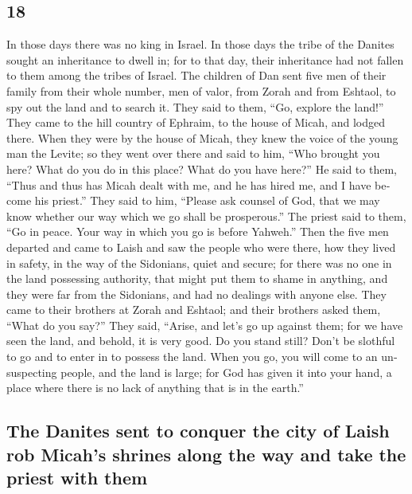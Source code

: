 \begin{paracol}{2}
\begin{otherlanguage}{english}
\hypertarget{section-35}{%
\section{18}\label{section-35}}

 In those days there was no king in Israel. In those days
the tribe of the Danites sought an inheritance to dwell in; for to that
day, their inheritance had not fallen to them among the tribes of
Israel.  The children of Dan sent five men of their family
from their whole number, men of valor, from Zorah and from Eshtaol, to
spy out the land and to search it. They said to them, ``Go, explore the
land!'' They came to the hill country of Ephraim, to the house of Micah,
and lodged there.  When they were by the house of Micah,
they knew the voice of the young man the Levite; so they went over there
and said to him, ``Who brought you here? What do you do in this place?
What do you have here?''  He said to them, ``Thus and thus
has Micah dealt with me, and he has hired me, and I have become his
priest.''  They said to him, ``Please ask counsel of God,
that we may know whether our way which we go shall be prosperous.''
 The priest said to them, ``Go in peace. Your way in which
you go is before Yahweh.''  Then the five men departed and
came to Laish and saw the people who were there, how they lived in
safety, in the way of the Sidonians, quiet and secure; for there was no
one in the land possessing authority, that might put them to shame in
anything, and they were far from the Sidonians, and had no dealings with
anyone else.  They came to their brothers at Zorah and
Eshtaol; and their brothers asked them, ``What do you say?''
 They said, ``Arise, and let's go up against them; for we
have seen the land, and behold, it is very good. Do you stand still?
Don't be slothful to go and to enter in to possess the land.
 When you go, you will come to an unsuspecting people,
and the land is large; for God has given it into your hand, a place
where there is no lack of anything that is in the earth.''

\hypertarget{the-danites-sent-to-conquer-the-city-of-laish-rob-micahs-shrines-along-the-way-and-take-the-priest-with-them}{%
\subsection{The Danites sent to conquer the city of Laish rob Micah's
shrines along the way and take the priest with
them}\label{the-danites-sent-to-conquer-the-city-of-laish-rob-micahs-shrines-along-the-way-and-take-the-priest-with-them}}


\end{otherlanguage}
\end{paracol}
